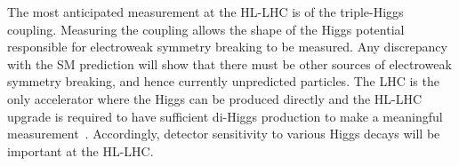 

The most anticipated measurement at the HL-LHC is of the triple-Higgs coupling. Measuring the coupling allows the shape of the Higgs potential responsible for electroweak symmetry breaking to be measured. Any discrepancy with the SM prediction will show that there must be other sources of electroweak symmetry breaking, and hence currently unpredicted particles. The LHC is the only accelerator where the Higgs can be produced directly and the HL-LHC upgrade is required to have sufficient di-Higgs production to make a meaningful measurement~\cite{dainese_physics_2018, cepeda_report_2018}. Accordingly, detector sensitivity to various Higgs decays will be important at the HL-LHC.


